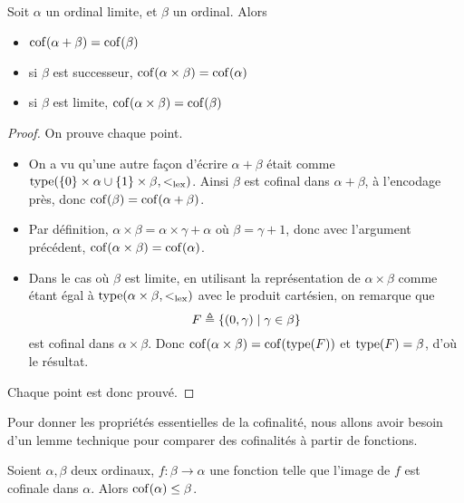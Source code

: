 \begin{proposition}\label{prop.cof.oper}
  Soit $\alpha$ un ordinal limite, et $\beta$ un ordinal. Alors
  \begin{itemize}
  \item $\operatorname{cof}(\alpha + \beta) = \operatorname{cof}(\beta)$
  \item si $\beta$ est successeur, $\operatorname{cof}(\alpha \times \beta) = \operatorname{cof}(\alpha)$
  \item si $\beta$ est limite, $\operatorname{cof}(\alpha\times\beta) = \operatorname{cof}(\beta)$
  \end{itemize}
\end{proposition}

\begin{proof}
  On prouve chaque point.
  \begin{itemize}
  \item On a vu qu'une autre façon d'écrire $\alpha + \beta$ était comme
    $\operatorname{type}(\{0\}\times\alpha \cup \{1\}\times\beta, <_{\mathrm{lex}})$. Ainsi $\beta$ est
    cofinal dans $\alpha + \beta$, à l'encodage près, donc
    $\operatorname{cof}(\beta) = \operatorname{cof}(\alpha + \beta)$.
  \item Par définition, $\alpha \times \beta = \alpha \times \gamma + \alpha$
    où $\beta = \gamma + 1$, donc avec l'argument précédent,
    $\operatorname{cof}(\alpha\times\beta) = \operatorname{cof}(\alpha)$.
  \item Dans le cas où $\beta$ est limite, en utilisant la représentation de
    $\alpha \times \beta$ comme étant égal à $\operatorname{type}(\alpha\times\beta,<_{\mathrm{lex}})$
    avec le produit cartésien, on remarque que
    \[F \triangleq \{(0,\gamma) \mid \gamma \in \beta\}\]
    est cofinal dans $\alpha \times \beta$. Donc
    $\operatorname{cof}(\alpha\times \beta) = \operatorname{cof}(\operatorname{type}(F))$ et $\operatorname{type}(F) = \beta$, d'où le
    résultat.
  \end{itemize}
  Chaque point est donc prouvé.
\end{proof}

Pour donner les propriétés essentielles de la cofinalité, nous allons avoir
besoin d'un lemme technique pour comparer des cofinalités à partir de fonctions.

\begin{proposition}\label{lem.cof.compar.surj}
  Soient $\alpha,\beta$ deux ordinaux, $f : \beta \to \alpha$ une fonction telle
  que l'image de $f$ est cofinale dans $\alpha$. Alors
  $\operatorname{cof}(\alpha) \leq \beta$.
\end{proposition}

